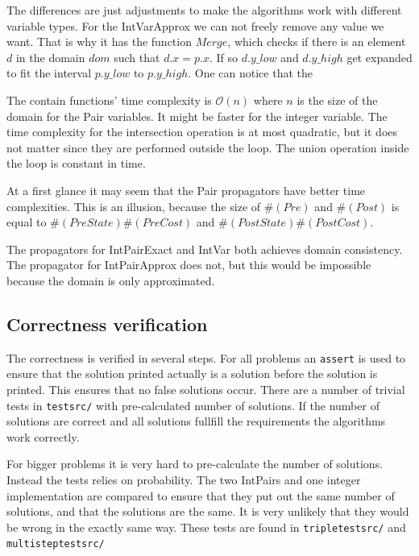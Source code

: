 \documentclass[a4paper,11pt]{article}
\begin{document}


The differences are just adjustments to make the algorithms work with different variable types. For the IntVarApprox we can not freely remove any value we want. That is why it has the function $Merge$, which checks if there is an element $d$ in the domain $dom$ such that $d.x=p.x$. If so $d.y\_low$ and $d.y\_high$ get expanded to fit the interval $p.y\_low$ to $p.y\_high$. One can notice that the

The contain functions' time complexity is $\mathcal{O}(n)$ where $n$ is the size of the domain for the Pair variables. It might be faster for the integer variable. The time complexity for the intersection operation is at most quadratic, but it does not matter since they are performed outside the loop. The union operation inside the loop is constant in time.

At a first glance it may seem that the Pair propagators have better time complexities. This is an illusion, because the size of $\#(Pre)$ and $\#(Post)$ is equal to $\#(PreState)\#(PreCost)$ and $\#(PostState)\#(PostCost)$.

The propagators for IntPairExact and IntVar both achieves domain consistency. The propagator for IntPairApprox does not, but this would be impossible because the domain is only approximated.

\subsection{Correctness verification}
The correctness is verified in several steps. For all problems an \texttt{assert} is used to ensure that the solution printed actually is a solution before the solution is printed. This ensures that no false solutions occur. There are a number of trivial tests in \texttt{testsrc/} with pre-calculated number of solutions. If the number of solutions are correct and all solutions fullfill the requirements the algorithms work correctly.

For bigger problems it is very hard to pre-calculate the number of solutions. Instead the tests relies on probability. The two IntPairs and one integer implementation are compared to ensure that they put out the same number of solutions, and that the solutions are the same. It is very unlikely that they would be wrong in the exactly same way. These tests are found in \texttt{tripletestsrc/} and \texttt{multisteptestsrc/}
\end{document}
